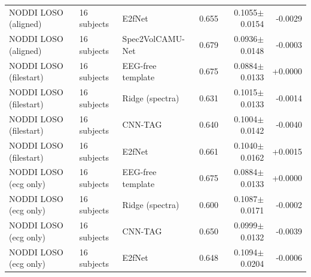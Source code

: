 \documentclass[10pt]{article}
\begin{document}
\begin{longtable}{l l l r r r}
NODDI LOSO (aligned) & 16 subjects & E2fNet & 0.655 & 0.1055$\pm$0.0154 & -0.0029 \\
NODDI LOSO (aligned) & 16 subjects & Spec2VolCAMU-Net & 0.679 & 0.0936$\pm$0.0148 & -0.0003 \\
NODDI LOSO (filestart) & 16 subjects & EEG-free template & 0.675 & 0.0884$\pm$0.0133 & +0.0000 \\
NODDI LOSO (filestart) & 16 subjects & Ridge (spectra) & 0.631 & 0.1015$\pm$0.0133 & -0.0014 \\
NODDI LOSO (filestart) & 16 subjects & CNN-TAG & 0.640 & 0.1004$\pm$0.0142 & -0.0040 \\
NODDI LOSO (filestart) & 16 subjects & E2fNet & 0.661 & 0.1040$\pm$0.0162 & +0.0015 \\
NODDI LOSO (ecg only) & 16 subjects & EEG-free template & 0.675 & 0.0884$\pm$0.0133 & +0.0000 \\
NODDI LOSO (ecg only) & 16 subjects & Ridge (spectra) & 0.600 & 0.1087$\pm$0.0171 & -0.0002 \\
NODDI LOSO (ecg only) & 16 subjects & CNN-TAG & 0.650 & 0.0999$\pm$0.0132 & -0.0039 \\
NODDI LOSO (ecg only) & 16 subjects & E2fNet & 0.648 & 0.1094$\pm$0.0204 & -0.0006 \\
\bottomrule
\end{longtable}
\end{document}
